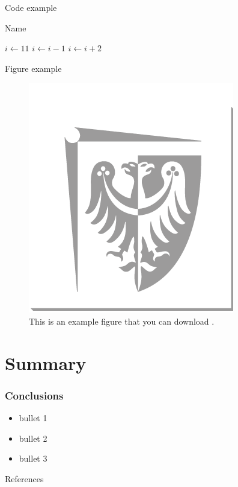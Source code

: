 \documentclass{beamer}
\begin{document}
\begin{frame}{Code example}
    \begin{algorithm}[H]
    \begin{algorithmic}
    \caption{Name}
    \State $i \gets 11$
    \State $i \gets i-1$
    \Else
        \State $i \gets i+2$
    \EndIf
    \EndIf 
    \end{algorithmic}
    \end{algorithm}
\end{frame}
    
\begin{frame}[fragile]{Figure example}
    \begin{figure}
        \centering
        \includegraphics[width=0.3\linewidth]{src/WUST/trans-logo.png}
        \caption{This is an example figure that you can download .}
        \label{fig:enter-label}
    \end{figure}
\end{frame}


\section{Summary}
    \begin{frame}
    \frametitle{Conclusions}
    \begin{itemize}
    \item bullet 1
    \item bullet 2
    \item bullet 3
    \end{itemize}
\end{frame}

\renewcommand{\bibfont}{\normalsize}
\begin{frame}[allowframebreaks]{References}
    \printbibliography[heading=none] %
\end{frame}


    \QApage
\end{document}
